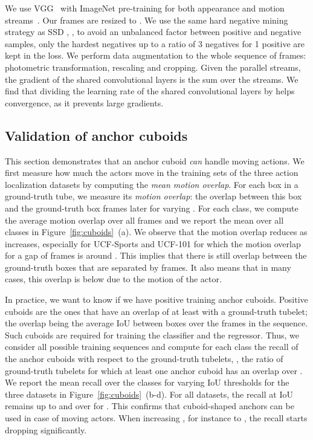 \documentclass[10pt,twocolumn,letterpaper]{article}
\begin{document}
We use VGG~\cite{simonyan15iclr} with ImageNet pre-training for both appearance and motion streams~\cite{Peng16eccv,wang16eccv}. 
Our frames are resized to . 
We use the same hard negative mining strategy as SSD \cite{liu16eccv}, \ie, to avoid an unbalanced factor between positive and negative samples, only the hardest negatives up to a ratio of 3 negatives for 1 positive are kept in the loss. 
We perform data augmentation to the whole sequence of frames: photometric transformation, rescaling and cropping. 
Given the  parallel streams, the gradient of the shared convolutional layers is the sum over the  streams. 
We find that dividing the learning rate of the shared convolutional layers by  helps convergence, as it prevents large gradients.

\subsection{Validation of anchor cuboids}
\label{sub:cuboid}

This section demonstrates that an anchor cuboid \textit{can} handle moving actions. We first measure how much the actors move in the training sets of the three action localization datasets by computing the \textit{mean motion overlap}. For each box in a ground-truth tube, we measure its \textit{motion overlap}: the overlap between this box and the ground-truth box  frames later for varying . For each class, we compute the average motion overlap over all frames and we report the mean over all classes in Figure~\ref{fig:cuboids}~(a). 
We observe that the motion overlap reduces as  increases, especially for UCF-Sports and UCF-101 for which the motion overlap for a gap of  frames is around . This implies that there is still overlap between the ground-truth boxes that are separated by  frames. 
It also means that in many cases, this overlap is below  due to the motion of the actor.  

In practice, we want to know if we have positive training anchor cuboids. Positive cuboids are the ones that have an overlap of at least  with a ground-truth tubelet; the overlap being the average IoU between boxes over the  frames in the sequence. Such cuboids are required for training the classifier and the regressor. Thus, we consider all possible training sequences and compute for each class the recall of the anchor cuboids with respect to the ground-truth tubelets, \ie, the ratio of ground-truth tubelets for which at least one anchor cuboid has an overlap over . 
We report the mean recall over the classes for varying IoU thresholds for the three datasets in Figure~\ref{fig:cuboids}~(b-d). For all datasets, the recall at IoU remains  up to  and over  for . This confirms that cuboid-shaped anchors can be used in case of moving actors. When increasing , for instance to , the recall starts dropping significantly. 
\end{document}
